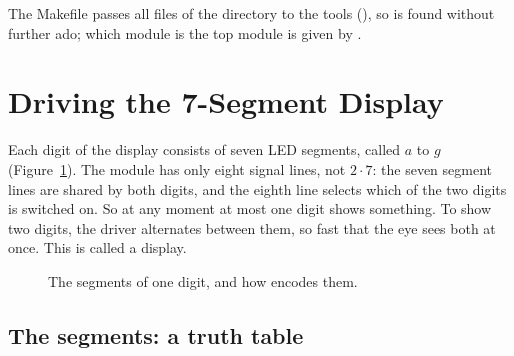 The Makefile passes all  files of the directory to the tools
(), so  is found without
further ado; which module is the top module is given by .

\section{Driving the 7-Segment Display}
\label{sec:step03-display}

Each digit of the display consists of seven LED segments, called $a$ to $g$
(Figure~\ref{fig:step03-segments}). The module has only eight signal lines,
not $2 \cdot 7$: the seven segment lines are shared by both digits, and the
eighth line selects which of the two digits is switched on. So at any moment
at most one digit shows something. To show two digits, the driver alternates
between them, so fast that the eye sees both at once. This is called
 a display.

\begin{figure}[ht]
\centering
{}
\caption{The segments of one digit, and how  encodes them.}
\label{fig:step03-segments}
\end{figure}

\subsection*{The segments: a truth table}

